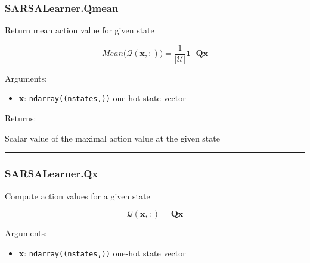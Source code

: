 \subsubsection{SARSALearner.Qmean}\label{sarsalearner.qmean}

\begin{Shaded}
\begin{Highlighting}[]
\end{Highlighting}
\end{Shaded}

Return mean action value for given state

\[
Mean \big(\mathcal Q(\mathbf x, :)\big) = \frac{1}{|\mathcal U|} \mathbf 1^\top \mathbf Q \mathbf x
\]

Arguments:

\begin{itemize}
\tightlist
\item
  \textbf{x}: \texttt{ndarray((nstates,))} one-hot state vector
\end{itemize}

Returns:

Scalar value of the maximal action value at the given state

\begin{center}\rule{0.5\linewidth}{\linethickness}\end{center}

\subsubsection{SARSALearner.Qx}\label{sarsalearner.qx}

\begin{Shaded}
\begin{Highlighting}[]
\end{Highlighting}
\end{Shaded}

Compute action values for a given state

\[
\mathcal Q(\mathbf x, :) = \mathbf Q \mathbf x
\]

Arguments:

\begin{itemize}
\tightlist
\item
  \textbf{x}: \texttt{ndarray((nstates,))} one-hot state vector
\end{itemize}

